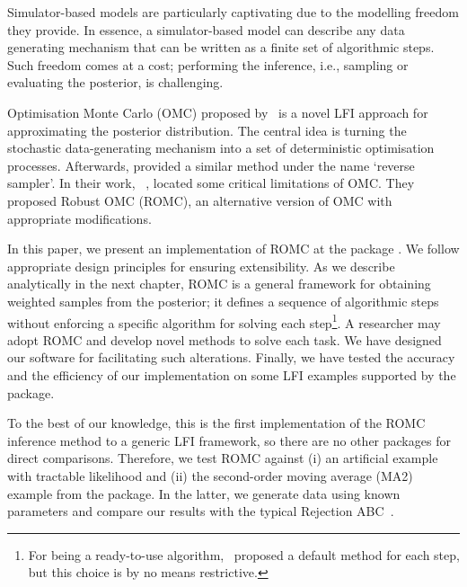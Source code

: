 Simulator-based models are particularly captivating due to the
modelling freedom they provide. In essence, a simulator-based model
can describe any data generating mechanism that can be written as a
finite set of algorithmic steps. Such freedom comes at a cost;
performing the inference, i.e., sampling or evaluating the posterior,
is challenging.

Optimisation Monte Carlo (OMC) proposed by~\citet{Meeds2015} is a
novel LFI approach for approximating the posterior distribution. The
central idea is turning the stochastic data-generating mechanism into
a set of deterministic optimisation processes. Afterwards,
\citet{Forneron2016} provided a similar method under the name `reverse
sampler'. In their work, ~\citet{Ikonomov2019}, located some critical
limitations of OMC. They proposed Robust OMC (ROMC), an alternative
version of OMC with appropriate modifications.

In this paper, we present an implementation of ROMC at the
 package . We follow appropriate design principles for ensuring
extensibility. As we describe analytically in the next chapter, ROMC
is a general framework for obtaining weighted samples from the
posterior; it defines a sequence of algorithmic steps without
enforcing a specific algorithm for solving each step\footnote{For
being a ready-to-use algorithm,~\citet{Ikonomov2019} proposed a
default method for each step, but this choice is by no means
restrictive.}. A researcher may adopt ROMC and develop novel methods
to solve each task. We have designed our software for facilitating
such alterations. Finally, we have tested the accuracy and the
efficiency of our implementation on some LFI examples supported by the
 package.

To the best of our knowledge, this is the first implementation of the
ROMC inference method to a generic LFI framework, so there are no
other packages for direct comparisons. Therefore, we test ROMC against
(i) an artificial example with tractable likelihood and (ii) the
second-order moving average (MA2) example from the 
package. In the latter, we generate data using known parameters and
compare our results with the typical Rejection
ABC~\citet{lintusaari2017}.